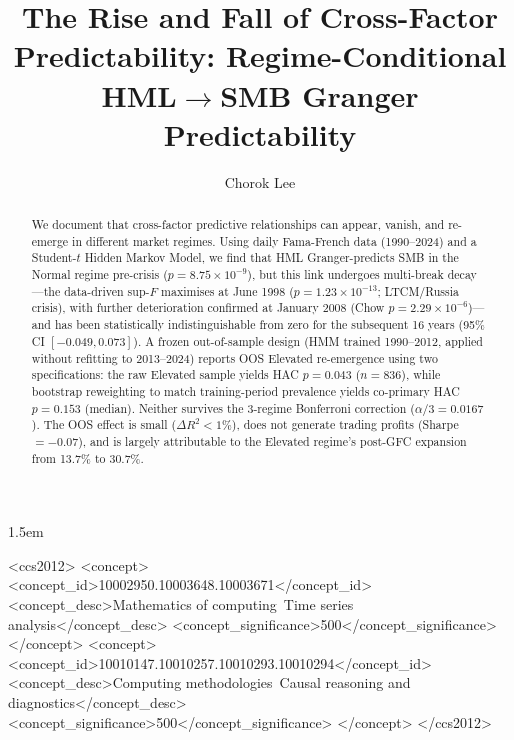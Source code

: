 \documentclass[sigconf,anonymous]{acmart}
\begin{document}
\sloppy
\emergencystretch 1.5em

\title{The Rise and Fall of Cross-Factor Predictability: Regime-Conditional HML$\to$SMB Granger Predictability}

\author{Chorok Lee}

\begin{abstract}
We document that cross-factor predictive relationships can appear, vanish, and
re-emerge in different market regimes.
Using daily Fama-French data (1990--2024) and a Student-$t$ Hidden Markov Model,
we find that HML Granger-predicts SMB in the Normal regime pre-crisis
($p = 8.75 \times 10^{-9}$), but this link undergoes multi-break decay---the
data-driven sup-$F$ maximises at June 1998 ($p = 1.23\times10^{-13}$; LTCM/Russia crisis),
with further deterioration confirmed at January 2008 (Chow $p = 2.29\times10^{-6}$)---and
has been statistically indistinguishable from zero for the subsequent 16 years
(95\% CI $[-0.049, 0.073]$).
A frozen out-of-sample design (HMM trained 1990--2012, applied without refitting
to 2013--2024) reports OOS Elevated re-emergence using two specifications: the raw
Elevated sample yields HAC $p = 0.043$ ($n = 836$), while bootstrap reweighting
to match training-period prevalence yields co-primary HAC $p = 0.153$ (median).
Neither survives the 3-regime Bonferroni correction ($\alpha/3 = 0.0167$).
The OOS effect is small ($\Delta R^2 < 1\%$), does not generate trading profits
(Sharpe $= -0.07$), and is largely attributable to the Elevated regime's post-GFC
expansion from 13.7\% to 30.7\%.
\end{abstract}

\begin{CCSXML}
<ccs2012>
   <concept>
       <concept_id>10002950.10003648.10003671</concept_id>
       <concept_desc>Mathematics of computing~Time series analysis</concept_desc>
       <concept_significance>500</concept_significance>
   </concept>
   <concept>
       <concept_id>10010147.10010257.10010293.10010294</concept_id>
       <concept_desc>Computing methodologies~Causal reasoning and diagnostics</concept_desc>
       <concept_significance>500</concept_significance>
   </concept>
</ccs2012>
\end{CCSXML}

\end{document}
